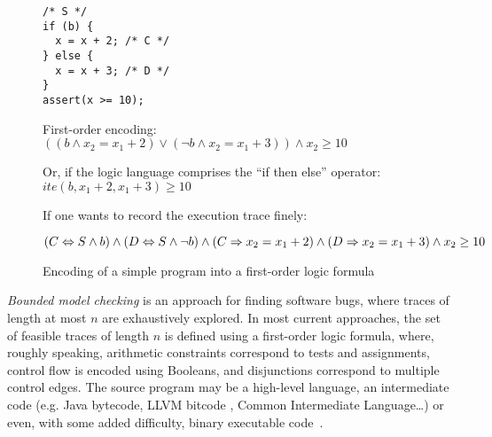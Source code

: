 \documentclass[a4paper,twocolumn,11pt]{article}
\newcommand{\ite}{\mathit{ite}}
\begin{document}
\begin{figure}
\begin{minipage}{0.3\textwidth}
\begin{lstlisting}
/* S */
if (b) {
  x = x + 2; /* C */
} else {
  x = x + 3; /* D */
}
assert(x >= 10);
\end{lstlisting}
\end{minipage}
\hfill
\begin{minipage}{\columnwidth}

First-order encoding:\\
$\left((b \land x_2 = x_1+2) \lor (\neg b \land x_2 = x_1+3)\right)
  \land x_2 \geq 10$
\medskip

Or, if the logic language comprises the ``if then else'' operator:
$\ite(b, x_1+2,x_1+3) \geq 10$
\medskip

If one wants to record the execution trace finely:

$(C \Leftrightarrow S \land b) \land (D \Leftrightarrow S \land \neg b)
\land\\(C \Rightarrow x_2 = x_1 + 2) \land (D \Rightarrow x_2 = x_1 + 3)
\land x_2 \geq 10
$
\end{minipage}

\caption{Encoding of a simple program into a first-order logic formula}
\label{fig:encoding}
\end{figure}

\emph{Bounded model checking} is an approach for finding software bugs, where traces of length at most $n$ are exhaustively explored.
In most current approaches, the set of feasible traces of length $n$ is defined using a first-order logic formula, where, roughly speaking, arithmetic constraints correspond to tests and assignments, control flow is encoded using Booleans, and disjunctions correspond to multiple control edges.
The source program may be a high-level language, an intermediate code (e.g. Java bytecode, LLVM bitcode \parencite{DBLP:conf/cgo/LattnerA04,DBLP:journals/entcs/HenryMM12}, Common Intermediate Language\dots) or even, with some added difficulty, binary executable code~\parencite{Chaki_Ivers_ISSE2010}.
\end{document}
